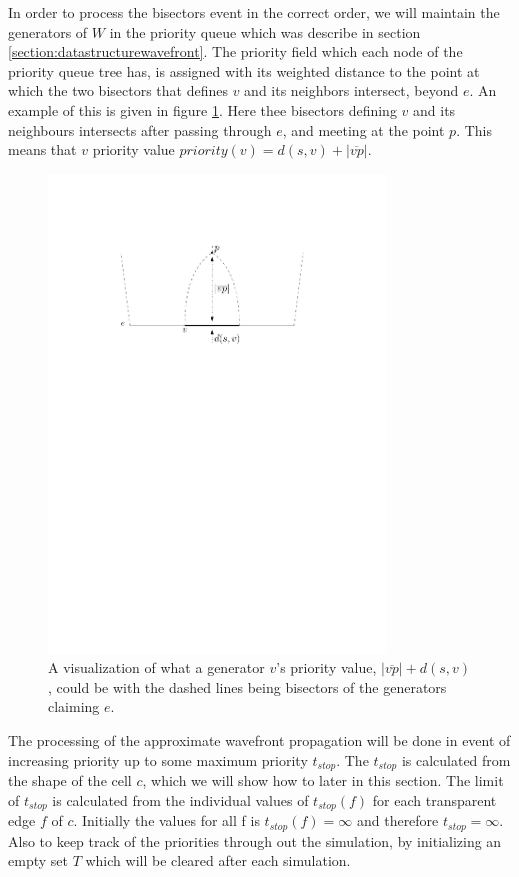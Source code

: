 In order to process the bisectors event in the correct order, we will maintain the generators of $W$ in the priority queue which was 
describe in section \ref{section:datastructurewavefront}. The priority field which each node of the priority queue tree has, is 
assigned with its weighted distance to the point at which the two bisectors that defines $v$ and its neighbors intersect, beyond $e$. 
An example of this is given in figure \ref{fig:priorityvalue}. Here thee bisectors defining $v$ and its neighbours intersects after 
passing through $e$, and meeting at the point $p$. This means that $v$ priority value $priority(v) = d(s,v) + |\overline{vp}|$.

\begin{figure}[H]
	\centering
	\includegraphics[width=0.8\textwidth]{figures/priorityvalue.pdf}
	\caption{A visualization of what a generator $v$'s priority value, $|\overline{vp}| + d(s,v)$, could be with the
	         dashed lines being bisectors of the generators claiming $e$.}
	\label{fig:priorityvalue}
\end{figure}

The processing of the approximate wavefront propagation will be done in event of increasing priority up to some maximum priority 
$t_{stop}$. The $t_{stop}$ is calculated from the shape of the cell $c$, which we will show how to later in this section. The limit of 
$t_{stop}$ is calculated from the individual values of $t_{stop}(f)$ for each transparent edge $f$ of $c$. Initially the values for all
f is $t_{stop}(f) = \infty$ and therefore $t_{stop} = \infty$. Also to keep track of the priorities through out the simulation, by 
initializing an empty set $T$ which will be cleared after each simulation.

